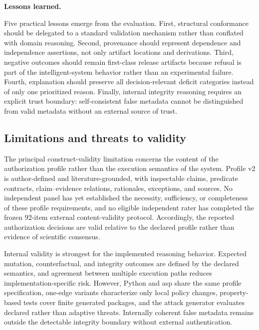 \documentclass[11pt,a4paper]{article}
\begin{document}
\noindent\textbf{Lessons learned.}\label{par:lessons-learned}\par

Five practical lessons emerge from the evaluation. First, structural
conformance should be delegated to a standard validation mechanism rather
than conflated with domain reasoning. Second, provenance should represent
dependence and independence assertions, not only artifact locations and
derivations. Third, negative outcomes should remain first-class release
artifacts because refusal is part of the intelligent-system behavior rather
than an experimental failure. Fourth, explanation should preserve all
decision-relevant deficit categories instead of only one prioritized reason.
Finally, internal integrity reasoning requires an explicit trust boundary:
self-consistent false metadata cannot be distinguished from valid metadata
without an external source of trust.


\subsection{Limitations and threats to validity}
\label{subsec:limitations}

The principal construct-validity limitation concerns the content of the
authorization profile rather than the execution semantics of the system.
Profile v2 is author-defined and literature-grounded, with inspectable claims,
predicate contracts, claim--evidence relations, rationales, exceptions, and
sources. No independent panel has yet established the necessity, sufficiency,
or completeness of these profile requirements, and no eligible independent
rater has completed the frozen 92-item external content-validity protocol.
Accordingly, the reported authorization decisions are valid relative to the
declared profile rather than evidence of scientific consensus.

Internal validity is strongest for the implemented reasoning behavior.
Expected mutation, counterfactual, and integrity outcomes are defined by the
declared semantics, and agreement between multiple execution paths reduces
implementation-specific risk. However, Python and \ac{asp} share the same
profile specification, one-edge variants characterize only local policy
changes, property-based tests cover finite generated packages, and the attack
generator evaluates declared rather than adaptive threats. Internally
coherent false metadata remains outside the detectable integrity boundary
without external authentication.
\end{document}
